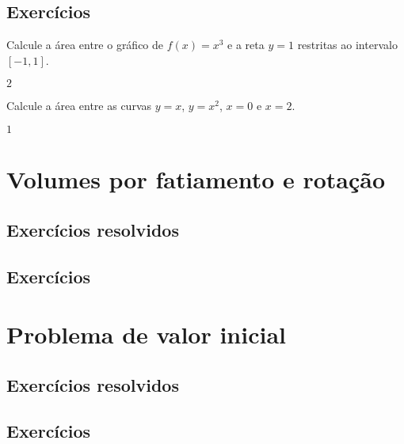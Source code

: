\subsection*{Exercícios}

\begin{exer}
  Calcule a área entre o gráfico de $f(x)=x^3$ e a reta $y=1$ restritas ao intervalo $[-1,1]$.
\end{exer}
\begin{resp}
  $2$
\end{resp}

\begin{exer}
  Calcule a área entre as curvas $y=x$, $y=x^2$, $x=0$ e $x=2$.
\end{exer}
\begin{resp}
  $1$
\end{resp}

\section{Volumes por fatiamento e rotação}\label{cap_apint_sec_volfat}

\emconstrucao

\subsection*{Exercícios resolvidos}

\emconstrucao

\subsection*{Exercícios}

\emconstrucao

\section{Problema de valor inicial}\label{cap_apint_sec_pvi}

\emconstrucao

\subsection*{Exercícios resolvidos}

\emconstrucao

\subsection*{Exercícios}

\emconstrucao